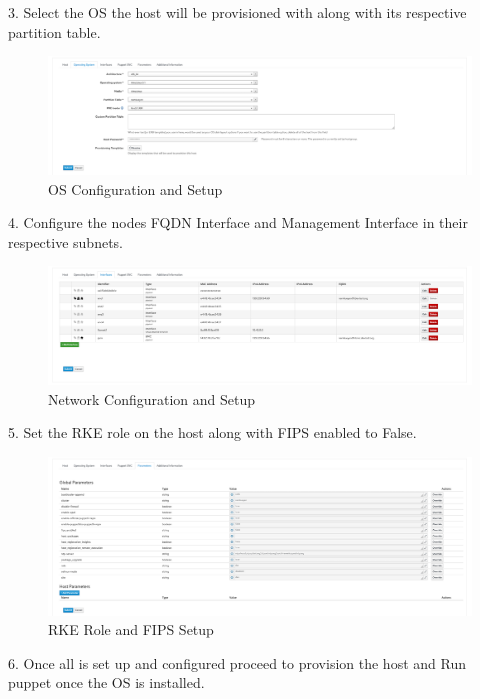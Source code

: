 3. Select the OS the host will be provisioned with along with its respective partition table.
\vspace{3cm}
\begin{figure}
    \includegraphics[width=14cm]{Images/Image13.png}
    \centering
    \caption{OS Configuration and Setup}
\end{figure}

\vfill\eject

4. Configure the nodes FQDN Interface and Management Interface in their respective subnets.
\vspace{0.5cm}
\begin{figure}
    \includegraphics[width=12cm]{Images/Image14.png}
    \centering
    \caption{Network Configuration and Setup}
\end{figure}

\vspace{0.5cm}

5. Set the RKE role on the host along with FIPS enabled to False.

\begin{figure}
    \includegraphics[width=12cm]{Images/Image15.png}
    \centering
    \caption{RKE Role and FIPS Setup}
\end{figure}


6. Once all is set up and configured proceed to provision the host and Run puppet once the OS is installed.

